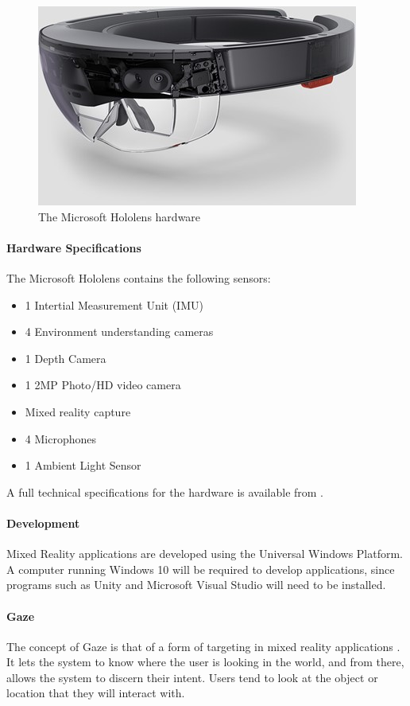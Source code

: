 \documentclass[12pt,a4paper]{report}
\begin{document}
\begin{figure}[h!]
	\begin{center}
		\includegraphics[scale=0.4]{Images/Literature/hololens.jpg}
		\caption{The Microsoft Hololens hardware \citep{Zeller}}
	\end{center}
\end{figure}

\paragraph{Hardware Specifications}
The Microsoft Hololens contains the following sensors:

\begin{itemize}
	\item 1 Intertial Measurement Unit (IMU)
	\item 4 Environment understanding cameras
	\item 1 Depth Camera
	\item 1 2MP Photo/HD video camera
	\item Mixed reality capture
	\item 4 Microphones
	\item 1 Ambient Light Sensor
\end{itemize}

A full technical specifications for the hardware is available from \cite{Microsoft2015}.

\paragraph{Development}
Mixed Reality applications are developed using the Universal Windows Platform. A computer running Windows 10 will be required to develop applications, since programs such as Unity and Microsoft Visual Studio will need to be installed.

\paragraph{Gaze}
The concept of Gaze is that of a form of targeting in mixed reality applications \citep{Microsoft}. It lets the system to know where the user is looking in the world, and from there, allows the system to discern their intent. Users tend to look at the object or location that they will interact with.
\end{document}

